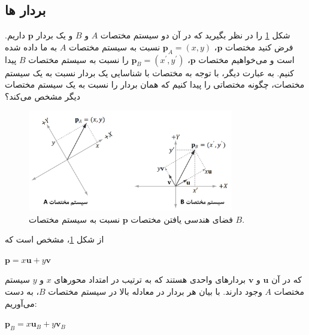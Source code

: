 \subsection{\textbf{بردار ها}}
\label{subsec:3.4.1}
{
    \Large
    \begin{spacing}{1.4}
        شکل \ref{fig:4.Session.1.3.11} را در نظر بگیرید که در آن دو سیستم مختصات $A$ و $B$ و یک بردار $\textbf{p}$ داریم.
        فرض کنید مختصات $\textbf{p}$، $\textbf{p}_{A}=(x, y)$ نسبت به سیستم مختصات $A$ به ما داده شده است
        و می‌خواهیم مختصات $\textbf{p}$، $\textbf{p}_{B}=(x^\prime, y^\prime)$ را نسبت به سیستم مختصات $B$ پیدا کنیم.
        به عبارت دیگر، با توجه به مختصات با شناسایی یک بردار نسبت به یک سیستم مختصات، چگونه مختصاتی را پیدا کنیم که همان بردار را نسبت به یک سیستم مختصات دیگر مشخص می‌کند؟

        \begin{figure}[H]
            \centering
            \setlength{\belowcaptionskip}{-10pt}
            \includegraphics[width=0.8\textwidth]{Images/4/3/4.Session.1.3.11}
            \caption {فضای هندسی یافتن مختصات $\textbf{p}$ نسبت به سیستم مختصات $B$.}
            \label{fig:4.Session.1.3.11}
        \end{figure}

        از شکل \ref{fig:4.Session.1.3.11}، مشخص است که

        \begin{center}
            $\textbf{p}=x\textbf{u}+y\textbf{v}$
        \end{center}

        که در آن $\textbf{u}$ و $\textbf{v}$ بردارهای واحدی هستند که به ترتیب در امتداد محورهای $x$ و $y$ سیستم مختصات $A$ وجود دارند.
        با بیان هر بردار در معادله بالا در سیستم مختصات $B$، به دست می‌آوریم:

        \begin{center}
            $\textbf{p}_{B}=x\textbf{u}_{B}+y\textbf{v}_{B}$
        \end{center}


\end{spacing}}
